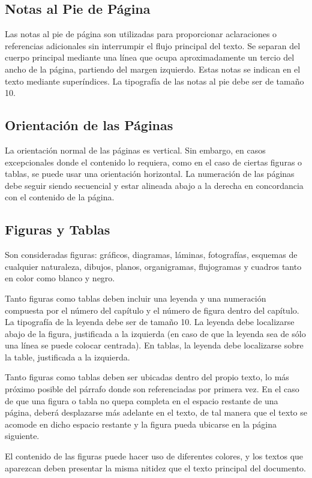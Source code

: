 \subsection{Notas al Pie de Página}
Las notas al pie de página son utilizadas para proporcionar aclaraciones o referencias adicionales sin interrumpir el flujo principal del texto. Se separan del cuerpo principal mediante una línea que ocupa aproximadamente un tercio del ancho de la página, partiendo del margen izquierdo. Estas notas se indican en el texto mediante superíndices. La tipografía de las notas al pie debe ser de tamaño 10. 

\subsection{Orientación de las Páginas}
La orientación normal de las páginas es vertical. Sin embargo, en casos excepcionales donde el contenido lo requiera, como en el caso de ciertas figuras o tablas, se puede usar una orientación horizontal. La numeración de las páginas debe seguir siendo secuencial y estar alineada abajo a la derecha en concordancia con el contenido de la página.

\subsection{Figuras y Tablas}
Son consideradas figuras: gráficos, diagramas, láminas, fotografías, esquemas de cualquier naturaleza, dibujos, planos, organigramas, flujogramas y cuadros tanto en color como blanco y negro.  

Tanto figuras como tablas deben incluir una leyenda y una numeración compuesta por el número del capítulo y el número de figura dentro del capítulo. La tipografía de la leyenda debe ser de tamaño 10. La leyenda debe localizarse abajo de la figura, justificada a la izquierda (en caso de que la leyenda sea de sólo una línea se puede colocar centrada). En tablas, la leyenda debe localizarse sobre la table, justificada a la izquierda. 

Tanto figuras como tablas deben ser ubicadas dentro del propio texto, lo más próximo posible del párrafo donde son referenciadas por primera vez. En el caso de que una figura o tabla no quepa completa en el espacio restante de una página, deberá desplazarse más adelante en el texto, de tal manera que el texto se acomode en dicho espacio restante y la figura pueda ubicarse en la página siguiente. 

El contenido de las figuras puede hacer uso de diferentes colores, y los textos que aparezcan deben presentar la misma nitidez que el texto principal del documento. 

